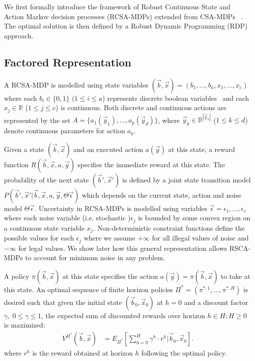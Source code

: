 We first formally introduce the framework of Robust Continuous State and Action Markov decision processes (RCSA-MDPs) extended from CSA-MDPs ~\cite{sdp_aaai}. The optimal solution is then defined by a Robust Dynamic Programming (RDP) approach. 
\subsection{Factored Representation}

A RCSA-MDP is modelled using state variables $(\vec{b},\vec{x}) = ( b_1,\ldots,b_a,x_{1},\ldots,x_c )$ where each $b_i \in \{ 0,1 \}$ ($1 \leq i \leq a$) represents discrete boolean variables $\,$
and each $x_j \in \mathbb{R}$ ($1 \leq j \leq c$) is continuous.  
Both discrete and continuous actions are represented by the set $A = \{a_1(\vec{y}_1), \ldots, a_p(\vec{y}_d) \}$, where  $\vec{y}_k \in \mathbb{R}^{|\vec{y}_k|}$ ($1\leq k \leq d$) denote continuous parameters for action $a_k$.

Given a state $(\vec{b},\vec{x})$ and an executed action $a(\vec{y})$ at this state, a
reward function $R(\vec{b},\vec{x},a,\vec{y})$ specifies the immediate reward at this state. The probability of the next state $(\vec{b}',\vec{x}')$ is defined by a joint state transition model $P(\vec{b}',\vec{x}'| \vec{b},\vec{x},a,\vec{y},\Theta\vec{\epsilon})$ which depends on the current state, action and noise model $\Theta\vec{\epsilon}$. Uncertainty in RCSA-MDPs is modelled using variables $\vec{\epsilon} = \epsilon_1, \ldots , \epsilon_c$ where each noise variable (i.e. stochastic )$\epsilon_j$ is bounded by some convex region on a continuous state variable $x_j$. Non-deterministic constraint functions define the possible values for each $\epsilon_j$ where we assume $+ \infty$ for all illegal values of noise and $-\infty$ for legal values. We show later how this general representation allows RSCA-MDPs to account for minimum noise in any problem. 

A policy $\pi(\vec{b},\vec{x})$ at this state specifies the action $a(\vec{y}) =
\pi(\vec{b},\vec{x})$ to take at this state.  An optimal sequence of finite horizon policies $\Pi^* = (\pi^{*,1},\ldots,\pi^{*,H})$ is desired such that given the initial state $(\vec{b}_0,\vec{x}_0)$ at $h=0$ and  a discount factor $\gamma, \; 0 \leq \gamma \leq 1$, the expected sum of discounted rewards over horizon $h \in H ;H \geq 0$ is maximized: 
\begin{align}
V^{\Pi^*}(\vec{b},\vec{x}) & = E_{\Pi^*} \left[ \sum_{h=0}^{H} \gamma^h \cdot r^h \Big| \vec{b}_0,\vec{x}_0\right].
\end{align}
where $r^h$ is the reward obtained at horizon $h$ following the optimal policy. 

